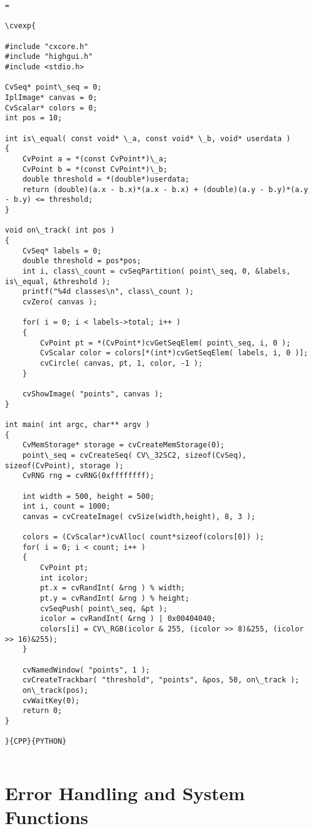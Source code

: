 \begin{verbatim}=

\cvexp{

#include "cxcore.h"
#include "highgui.h"
#include <stdio.h>

CvSeq* point\_seq = 0;
IplImage* canvas = 0;
CvScalar* colors = 0;
int pos = 10;

int is\_equal( const void* \_a, const void* \_b, void* userdata )
{
    CvPoint a = *(const CvPoint*)\_a;
    CvPoint b = *(const CvPoint*)\_b;
    double threshold = *(double*)userdata;
    return (double)(a.x - b.x)*(a.x - b.x) + (double)(a.y - b.y)*(a.y - b.y) <= threshold;
}

void on\_track( int pos )
{
    CvSeq* labels = 0;
    double threshold = pos*pos;
    int i, class\_count = cvSeqPartition( point\_seq, 0, &labels, is\_equal, &threshold );
    printf("%4d classes\n", class\_count );
    cvZero( canvas );

    for( i = 0; i < labels->total; i++ )
    {
        CvPoint pt = *(CvPoint*)cvGetSeqElem( point\_seq, i, 0 );
        CvScalar color = colors[*(int*)cvGetSeqElem( labels, i, 0 )];
        cvCircle( canvas, pt, 1, color, -1 );
    }

    cvShowImage( "points", canvas );
}

int main( int argc, char** argv )
{
    CvMemStorage* storage = cvCreateMemStorage(0);
    point\_seq = cvCreateSeq( CV\_32SC2, sizeof(CvSeq), sizeof(CvPoint), storage );
    CvRNG rng = cvRNG(0xffffffff);

    int width = 500, height = 500;
    int i, count = 1000;
    canvas = cvCreateImage( cvSize(width,height), 8, 3 );

    colors = (CvScalar*)cvAlloc( count*sizeof(colors[0]) );
    for( i = 0; i < count; i++ )
    {
        CvPoint pt;
        int icolor;
        pt.x = cvRandInt( &rng ) % width;
        pt.y = cvRandInt( &rng ) % height;
        cvSeqPush( point\_seq, &pt );
        icolor = cvRandInt( &rng ) | 0x00404040;
        colors[i] = CV\_RGB(icolor & 255, (icolor >> 8)&255, (icolor >> 16)&255);
    }

    cvNamedWindow( "points", 1 );
    cvCreateTrackbar( "threshold", "points", &pos, 50, on\_track );
    on\_track(pos);
    cvWaitKey(0);
    return 0;
}

}{CPP}{PYTHON}


\end{verbatim}
\section{Error Handling and System Functions}
\begin{verbatim}


\end{verbatim}
